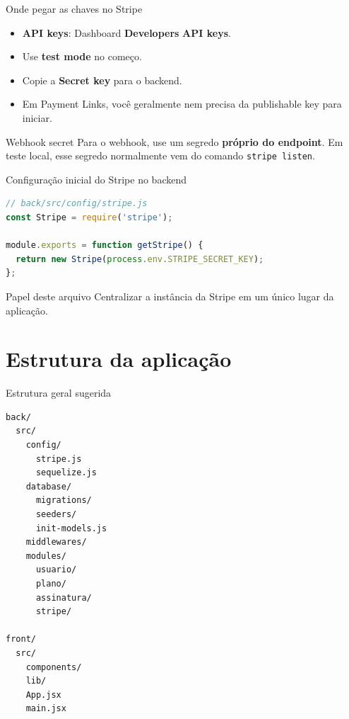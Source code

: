 \documentclass[aspectratio=169]{beamer}
\newcommand{\code}[1]{\texttt{#1}}
\begin{document}
\begin{frame}{Onde pegar as chaves no Stripe}
\begin{itemize}
  \item \textbf{API keys}: Dashboard \textrightarrow{} \textbf{Developers} \textrightarrow{} \textbf{API keys}.
  \item Use \textbf{test mode} no começo.
  \item Copie a \textbf{Secret key} para o backend.
  \item Em Payment Links, você geralmente nem precisa da publishable key para iniciar.
\end{itemize}

\begin{block}{Webhook secret}
Para o webhook, use um segredo \textbf{próprio do endpoint}. Em teste local, esse segredo normalmente vem do comando \code{stripe listen}.
\end{block}
\end{frame}

\begin{frame}[fragile]{Configuração inicial do Stripe no backend}
\begin{lstlisting}[language=JavaScript]
// back/src/config/stripe.js
const Stripe = require('stripe');

module.exports = function getStripe() {
  return new Stripe(process.env.STRIPE_SECRET_KEY);
};
\end{lstlisting}

\begin{exampleblock}{Papel deste arquivo}
Centralizar a instância da Stripe em um único lugar da aplicação.
\end{exampleblock}
\end{frame}

\section{Estrutura da aplicação}

\begin{frame}[fragile]{Estrutura geral sugerida}
\begin{lstlisting}[language={}]
back/
  src/
    config/
      stripe.js
      sequelize.js
    database/
      migrations/
      seeders/
      init-models.js
    middlewares/
    modules/
      usuario/
      plano/
      assinatura/
      stripe/

front/
  src/
    components/
    lib/
    App.jsx
    main.jsx
\end{lstlisting}
\end{frame}
\end{document}
